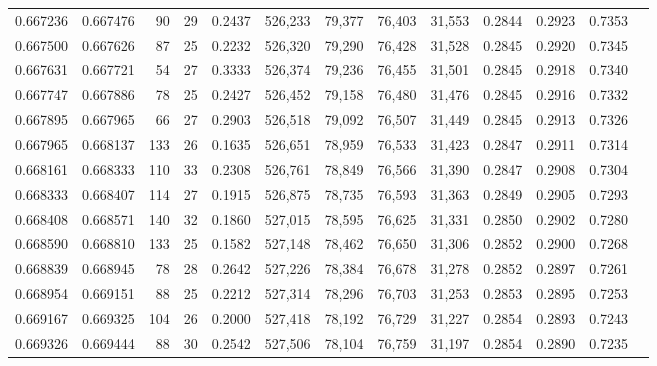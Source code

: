 \begin{tabular}{rrrrrrrrrrrrr}
0.667236 & 0.667476 &     90 &    29 &                                     0.2437 & 526,233 &  79,377 &  76,403 &  31,553 & 0.2844 & 0.2923 & 0.7353 \\
0.667500 & 0.667626 &     87 &    25 &                                     0.2232 & 526,320 &  79,290 &  76,428 &  31,528 & 0.2845 & 0.2920 & 0.7345 \\
0.667631 & 0.667721 &     54 &    27 &                                     0.3333 & 526,374 &  79,236 &  76,455 &  31,501 & 0.2845 & 0.2918 & 0.7340 \\
0.667747 & 0.667886 &     78 &    25 &                                     0.2427 & 526,452 &  79,158 &  76,480 &  31,476 & 0.2845 & 0.2916 & 0.7332 \\
0.667895 & 0.667965 &     66 &    27 &                                     0.2903 & 526,518 &  79,092 &  76,507 &  31,449 & 0.2845 & 0.2913 & 0.7326 \\
0.667965 & 0.668137 &    133 &    26 &                                     0.1635 & 526,651 &  78,959 &  76,533 &  31,423 & 0.2847 & 0.2911 & 0.7314 \\
0.668161 & 0.668333 &    110 &    33 &                                     0.2308 & 526,761 &  78,849 &  76,566 &  31,390 & 0.2847 & 0.2908 & 0.7304 \\
0.668333 & 0.668407 &    114 &    27 &                                     0.1915 & 526,875 &  78,735 &  76,593 &  31,363 & 0.2849 & 0.2905 & 0.7293 \\
0.668408 & 0.668571 &    140 &    32 &                                     0.1860 & 527,015 &  78,595 &  76,625 &  31,331 & 0.2850 & 0.2902 & 0.7280 \\
0.668590 & 0.668810 &    133 &    25 &                                     0.1582 & 527,148 &  78,462 &  76,650 &  31,306 & 0.2852 & 0.2900 & 0.7268 \\
0.668839 & 0.668945 &     78 &    28 &                                     0.2642 & 527,226 &  78,384 &  76,678 &  31,278 & 0.2852 & 0.2897 & 0.7261 \\
0.668954 & 0.669151 &     88 &    25 &                                     0.2212 & 527,314 &  78,296 &  76,703 &  31,253 & 0.2853 & 0.2895 & 0.7253 \\
0.669167 & 0.669325 &    104 &    26 &                                     0.2000 & 527,418 &  78,192 &  76,729 &  31,227 & 0.2854 & 0.2893 & 0.7243 \\
0.669326 & 0.669444 &     88 &    30 &                                     0.2542 & 527,506 &  78,104 &  76,759 &  31,197 & 0.2854 & 0.2890 & 0.7235 \\

\end{tabular}
